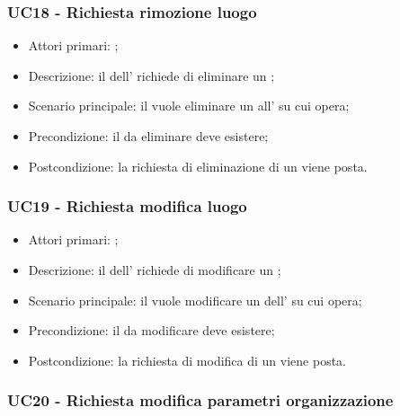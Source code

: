 \documentclass[../analisi-dei-requisiti]{subfiles}
\begin{document}
\subsubsection{UC18 - Richiesta rimozione luogo}
\label{subsub:UC18}

\begin{itemize}
\item Attori primari: ;
\item Descrizione: il  dell' richiede di eliminare un ;
\item Scenario principale: il  vuole eliminare un  all' su cui opera;
\item Precondizione: il  da eliminare deve esistere;
\item Postcondizione: la richiesta di eliminazione di un  viene posta.

\end{itemize}

\subsubsection{UC19 - Richiesta modifica luogo}
\label{subsub:UC19}

\begin{itemize}
\item Attori primari: ;
\item Descrizione: il  dell' richiede di modificare un ;
\item Scenario principale: il  vuole modificare un  dell' su cui opera;
\item Precondizione: il  da modificare deve esistere;
\item Postcondizione: la richiesta di modifica di un  viene posta.

\end{itemize}


\subsubsection{UC20 - Richiesta modifica parametri organizzazione}
\label{subsub:UC20}
\end{document}
